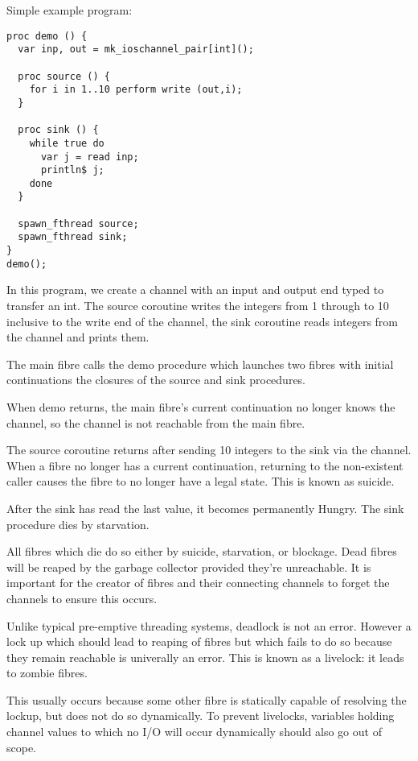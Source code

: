 \documentclass{article}
\begin{document}
Simple example program:

\begin{verbatim}
proc demo () {
  var inp, out = mk_ioschannel_pair[int]();

  proc source () {
    for i in 1..10 perform write (out,i);
  }

  proc sink () {
    while true do
      var j = read inp;
      println$ j;
    done
  }

  spawn_fthread source;
  spawn_fthread sink;
}
demo();
\end{verbatim}

In this program, we create a channel with an input and
output end typed to transfer an int. The source coroutine
writes the integers from 1 through to 10 inclusive to
the write end of the channel, the sink coroutine
reads integers from the channel and prints them.

The main fibre calls the demo procedure which launches
two fibres with initial continuations the closures of
the source and sink procedures.

When demo returns, the main fibre's current continuation
no longer knows the channel, so the channel is not reachable
from the main fibre. 

The source coroutine returns after sending 10 integers to
the sink via the channel.  When a fibre no longer has
a current continuation, returning to the non-existent
caller causes the fibre to no longer have a legal
state. This is known as suicide.

After the sink has read the 
last value, it becomes permanently Hungry. The sink 
procedure dies by starvation.

All fibres which die do so either by suicide, starvation,
or blockage. Dead fibres will be reaped by the garbage
collector provided they're unreachable. It is important
for the creator of fibres and their connecting channels
to forget the channels to ensure this occurs.

Unlike typical pre-emptive threading systems, deadlock
is not an error. However a lock up which should lead to
reaping of fibres but which fails to do so because
they remain reachable is univerally an error. This is
known as a livelock: it leads to zombie fibres.

This usually occurs because some other fibre is statically
capable of resolving the lockup, but does not do so 
dynamically. To prevent livelocks, variables holding
channel values to which no I/O will occur dynamically
should also go out of scope.
 
\end{document}
